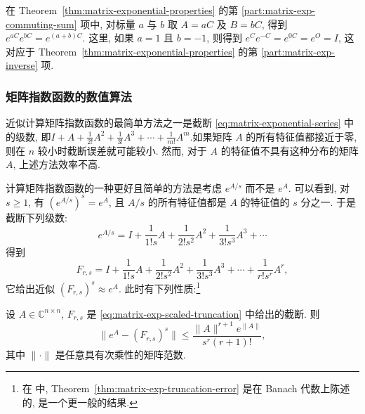 {在 Theorem~\ref{thm:matrix-exponential-properties} 的第 \ref{part:matrix-exp-commuting-sum} 项中, 对标量 $a$ 与 $b$ 取 $A=aC$ 及 $B=bC$, 得到 $e^{aC}e^{bC}=e^{(a+b)C}$. 这里, 如果 $a=1$ 且 $b=-1$, 则得到 $e^Ce^{-C}=e^{0C}=e^O=I$, 这对应于 Theorem~\ref{thm:matrix-exponential-properties} 的第 \ref{part:matrix-exp-inverse} 项.}

\subsubsection{{矩阵指数函数的数值算法}}\label{subsec:matrix-exponential-algorithms}

{近似计算矩阵指数函数的最简单方法之一是截断 \eqref{eq:matrix-exponential-series} 中的级数, 即\newline{}$I+A+\frac{1}{2!}A^2+\frac{1}{3!}A^3+\cdots+\frac{1}{m!}A^m$.\newline{}如果矩阵 $A$ 的所有特征值都接近于零, 则在 $n$ 较小时截断误差就可能较小. 然而, 对于 $A$ 的特征值不具有这种分布的矩阵 $A$, 上述方法效率不高.}

{计算矩阵指数函数的一种更好且简单的方法是考虑 $e^{A/s}$ 而不是 $e^A$. 可以看到, 对 $s\ge1$, 有 $(e^{A/s})^s=e^A$, 且 $A/s$ 的所有特征值都是 $A$ 的特征值的 $s$ 分之一. 于是截断下列级数:}
\begin{equation}\label{eq:matrix-exp-scaled-series}e^{A/s}=I+\frac{1}{1!s}A+\frac{1}{2!s^2}A^2+\frac{1}{3!s^3}A^3+\cdots\end{equation}
{得到}
\begin{equation}\label{eq:matrix-exp-scaled-truncation}F_{r,s}=I+\frac{1}{1!s}A+\frac{1}{2!s^2}A^2+\frac{1}{3!s^3}A^3+\cdots+\frac{1}{r!s^r}A^r,\end{equation}
{它给出近似 $(F_{r,s})^s\approx e^A$. 此时有下列性质:}\footnote{{在  中, Theorem~\ref{thm:matrix-exp-truncation-error} 是在 Banach 代数上陈述的, 是一个更一般的结果.}}

\begin{Theorem}{}\label{thm:matrix-exp-truncation-error}
{设 $A\in\mathbb{C}^{n\times n}$, $F_{r,s}$ 是 \eqref{eq:matrix-exp-scaled-truncation} 中给出的截断. 则}
\begin{equation}\label{eq:matrix-exp-truncation-error}\|e^A-(F_{r,s})^s\|\le\frac{\|A\|^{r+1}e^{\|A\|}}{s^r(r+1)!},\end{equation}
{其中 $\|\cdot\|$ 是任意具有次乘性的矩阵范数.}\footnotemark
\end{Theorem}

